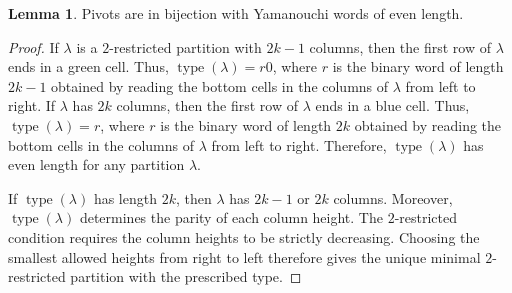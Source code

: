 \documentclass[11pt]{article}
\theoremstyle{definition}
\newtheorem{lemma}[theorem]{Lemma}
\theoremstyle{remark}
\theoremstyle{definition}
\numberwithin{equation}{section}
\newcommand{\type}{\operatorname{type}}
\begin{document}
\begin{lemma}\label{lemma:piv_evenYam}
Pivots are in bijection with Yamanouchi words of even length.
\end{lemma}
\begin{proof}
If $\lambda$ is a $2$-restricted partition with $2k-1$ columns, then the first row of $\lambda$ ends in a green cell. Thus, $\type(\lambda)=r0$, where $r$ is the binary word of length $2k-1$ obtained by reading the bottom cells in the columns of $\lambda$ from left to right. If $\lambda$ has $2k$ columns, then the first row of $\lambda$ ends in a blue cell. Thus, $\type(\lambda)=r$, where $r$ is the binary word of length $2k$ obtained by reading the bottom cells in the columns of $\lambda$ from left to right. Therefore, $\type(\lambda)$ has even length for any partition $\lambda$.

If $\type(\lambda)$ has length $2k$, then $\lambda$ has $2k-1$ or $2k$ columns. Moreover, $\type(\lambda)$ determines the parity of each column height. The $2$-restricted condition requires the column heights to be strictly decreasing. Choosing the smallest allowed heights from right to left therefore gives the unique minimal $2$-restricted partition with the prescribed type.


\end{proof}
\end{document}
